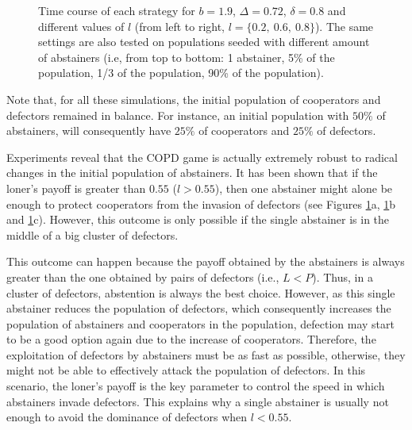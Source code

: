 \documentclass{llncs}
\begin{document}
\begin{figure}[p]
    \centering
    {}
    {}
    {}

    {}
    {}
    {}

    {}
    {}
    {}

    {}
    {}
    {}

    \caption{
        Time course of each strategy for $b=1.9$, $\Delta=0.72$,
        $\delta=0.8$ and different values of $l$ (from left to right,
        $l=\{0.2,\ 0.6,\ 0.8\}$). The same settings are also tested
        on populations seeded with different amount of abstainers
        (i.e, from top to bottom: 1 abstainer, 5\% of the population,
        1/3 of the population, 90\% of the population).
    }
    \label{fig:unbalanced}
\end{figure}

Note that, for all these simulations, the initial population of cooperators and
defectors remained in balance. For instance, an initial population with $50\%$
of abstainers, will consequently have $25\%$ of cooperators and $25\%$ of
defectors.

Experiments reveal that the COPD game is actually extremely robust to radical
changes in the initial population of abstainers. It has been shown that if the
loner’s payoff is greater than $0.55$ ($l>0.55$), then one abstainer might alone
be enough to protect cooperators from the invasion of defectors (see Figures
\ref{fig:unbalanced}a, \ref{fig:unbalanced}b and \ref{fig:unbalanced}c).
However, this outcome is only possible if the single abstainer is in the middle
of a big cluster of defectors.

This outcome can happen because the payoff obtained by the abstainers is always
greater than the one obtained by pairs of defectors (i.e., $L<P$). Thus, in a
cluster of defectors, abstention is always the best choice. However, as this single
abstainer reduces the population of defectors, which consequently increases the
population of abstainers and cooperators in the population, defection may start
to be a good option again due to the increase of cooperators. Therefore, the
exploitation of defectors by abstainers must be as fast as possible, otherwise,
they might not be able to effectively attack the population of defectors. In
this scenario, the loner’s payoff is the key parameter to control the speed in
which abstainers invade defectors. This explains why a single abstainer
is usually not enough to avoid the dominance of defectors when $l<0.55$.
\end{document}

